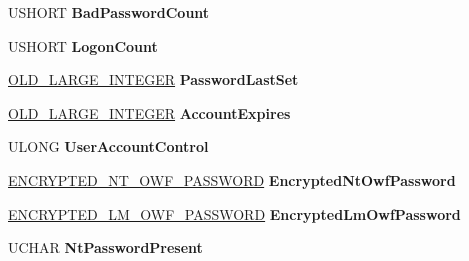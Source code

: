 \begin{DoxyCompactItemize}
U\+S\+H\+O\+RT {\bfseries Bad\+Password\+Count}
\item 
\mbox{\label{struct___n_e_t_l_o_g_o_n___d_e_l_t_a___u_s_e_r_abeaf84d324446efcb375cb0d2cd8ff66}} 
U\+S\+H\+O\+RT {\bfseries Logon\+Count}
\item 
\mbox{\label{struct___n_e_t_l_o_g_o_n___d_e_l_t_a___u_s_e_r_a42df735d8871afe2d6b35c42db980210}} 
\hyperlink{struct___o_l_d___l_a_r_g_e___i_n_t_e_g_e_r}{O\+L\+D\+\_\+\+L\+A\+R\+G\+E\+\_\+\+I\+N\+T\+E\+G\+ER} {\bfseries Password\+Last\+Set}
\item 
\mbox{\label{struct___n_e_t_l_o_g_o_n___d_e_l_t_a___u_s_e_r_a34784bda5f92570cd91e99c787467f90}} 
\hyperlink{struct___o_l_d___l_a_r_g_e___i_n_t_e_g_e_r}{O\+L\+D\+\_\+\+L\+A\+R\+G\+E\+\_\+\+I\+N\+T\+E\+G\+ER} {\bfseries Account\+Expires}
\item 
\mbox{\label{struct___n_e_t_l_o_g_o_n___d_e_l_t_a___u_s_e_r_aa03f162e32c0594330b2af28643f4b2a}} 
U\+L\+O\+NG {\bfseries User\+Account\+Control}
\item 
\mbox{\label{struct___n_e_t_l_o_g_o_n___d_e_l_t_a___u_s_e_r_a1a18472ec8e8b715905df3a9254d2585}} 
\hyperlink{struct___e_n_c_r_y_p_t_e_d___l_m___o_w_f___p_a_s_s_w_o_r_d}{E\+N\+C\+R\+Y\+P\+T\+E\+D\+\_\+\+N\+T\+\_\+\+O\+W\+F\+\_\+\+P\+A\+S\+S\+W\+O\+RD} {\bfseries Encrypted\+Nt\+Owf\+Password}
\item 
\mbox{\label{struct___n_e_t_l_o_g_o_n___d_e_l_t_a___u_s_e_r_a486a7f9e86ce54d78a9ae411cf0dee35}} 
\hyperlink{struct___e_n_c_r_y_p_t_e_d___l_m___o_w_f___p_a_s_s_w_o_r_d}{E\+N\+C\+R\+Y\+P\+T\+E\+D\+\_\+\+L\+M\+\_\+\+O\+W\+F\+\_\+\+P\+A\+S\+S\+W\+O\+RD} {\bfseries Encrypted\+Lm\+Owf\+Password}
\item 
\mbox{\label{struct___n_e_t_l_o_g_o_n___d_e_l_t_a___u_s_e_r_aa7e9eacb1802e7faa13f645be0e2772c}} 
U\+C\+H\+AR {\bfseries Nt\+Password\+Present}
\item 
\mbox{\label{struct___n_e_t_l_o_g_o_n___d_e_l_t_a___u_s_e_r_ac4c0dad3bc656ba825aaf74d10f41c1c}} 

\end{DoxyCompactItemize}

